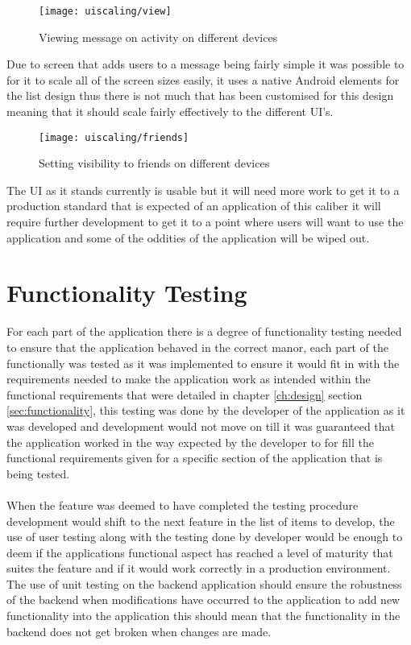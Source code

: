 \begin{figure}[H]
    \centering
    \texttt{[image: uiscaling/view]}
    \caption{Viewing message on activity on different devices}
    \label{fig:ui_scaling_view_image}
\end{figure} 

\noindent
Due to screen that adds users to a message being fairly simple it was possible to for it to scale all of the screen sizes easily, it uses a native Android elements for the list design thus there is not much that has been customised for this design meaning that it should scale fairly effectively to the different UI's.

\begin{figure}[H]
    \centering
    \texttt{[image: uiscaling/friends]}
    \caption{Setting visibility to friends on different devices}
    \label{fig:ui_scaling_friends_image}
\end{figure} 

\noindent
The UI as it stands currently is usable but it will need more work to get it to a production standard that is expected of an application of this caliber it will require further development to get it to a point where users will want to use the application and some of the oddities of the application will be wiped out.

\section{Functionality Testing}

For each part of the application there is a degree of functionality testing needed to ensure that the application behaved in the correct manor, each part of the functionally was tested as it was implemented to ensure it would fit in with the requirements needed to make the application work as intended within the functional requirements that were detailed in chapter \ref{ch:design} section \ref{sec:functionality}, this testing was done by the developer of the application as it was developed and development would not move on till it was guaranteed that the application worked in the way expected by the developer to for fill the functional requirements given for a specific section of the application that is being tested.\\
\\
When the feature was deemed to have completed the testing procedure development would shift to the next feature in the list of items to develop, the use of user testing along with the testing done by developer would be enough to deem if the applications functional aspect has reached a level of maturity that suites the feature and if it would work correctly in a production environment. The use of unit testing on the backend application should ensure the robustness of the backend when modifications have occurred to the application to add new functionality into the application this should mean that the functionality in the backend does not get broken when changes are made.

